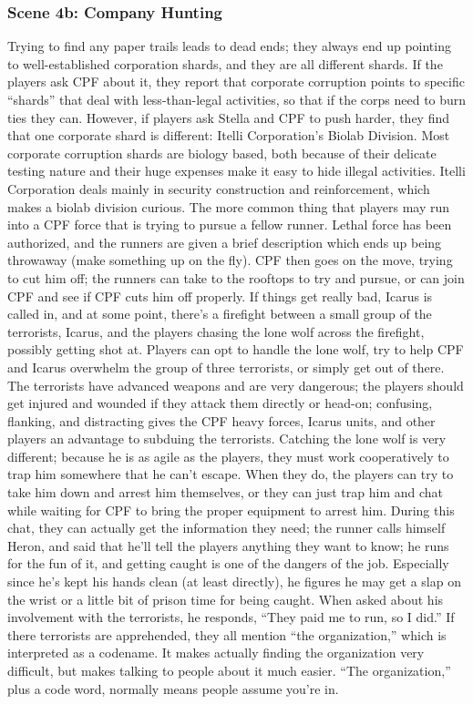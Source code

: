 \documentclass{article}
\begin{document}
\subsubsection{Scene 4b: Company Hunting}
Trying to find any paper trails leads to dead ends; they always end up pointing to well-established corporation shards, and they are all different shards. If the players ask CPF about it, they report that corporate corruption points to specific “shards” that deal with less-than-legal activities, so that if the corps need to burn ties they can. However, if players ask Stella and CPF to push harder, they find that one corporate shard is different: Itelli Corporation’s Biolab Division. Most corporate corruption shards are biology based, both because of their delicate testing nature and their huge expenses make it easy to hide illegal activities. Itelli Corporation deals mainly in security construction and reinforcement, which makes a biolab division curious.
The more common thing that players may run into a CPF force that is trying to pursue a fellow runner. Lethal force has been authorized, and the runners are given a brief description which ends up being throwaway (make something up on the fly). CPF then goes on the move, trying to cut him off; the runners can take to the rooftops to try and pursue, or can join CPF and see if CPF cuts him off properly.
If things get really bad, Icarus is called in, and at some point, there’s a firefight between a small group of the terrorists, Icarus, and the players chasing the lone wolf across the firefight, possibly getting shot at. Players can opt to handle the lone wolf, try to help CPF and Icarus overwhelm the group of three terrorists, or simply get out of there. The terrorists have advanced weapons and are very dangerous; the players should get injured and wounded if they attack them directly or head-on; confusing, flanking, and distracting gives the CPF heavy forces, Icarus units, and other players an advantage to subduing the terrorists.
Catching the lone wolf is very different; because he is as agile as the players, they must work cooperatively to trap him somewhere that he can’t escape. When they do, the players can try to take him down and arrest him themselves, or they can just trap him and chat while waiting for CPF to bring the proper equipment to arrest him. During this chat, they can actually get the information they need; the runner calls himself Heron, and said that he’ll tell the players anything they want to know; he runs for the fun of it, and getting caught is one of the dangers of the job. Especially since he’s kept his hands clean (at least directly), he figures he may get a slap on the wrist or a little bit of prison time for being caught. When asked about his involvement with the terrorists, he responds, “They paid me to run, so I did.”
If there terrorists are apprehended, they all mention “the organization,” which is interpreted as a codename. It makes actually finding the organization very difficult, but makes talking to people about it much easier. “The organization,” plus a code word, normally means people assume you’re in.
\end{document}
